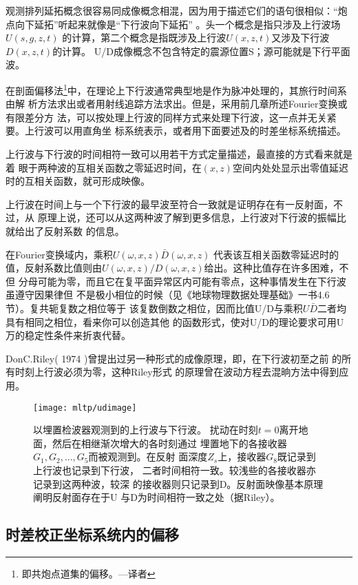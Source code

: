 观测排列延拓概念很容易同成像概念相混，因为用于描述它们的语句很相似：“炮
点向下延拓”听起来就像是“下行波向下延拓”
。头一个概念是指只涉及上行波场$U(s,g,z,t)$
的计算，第二个概念是指既涉及上行波$U(x,z,t)$又涉及下行波$D(x,z,t)$的计算。
U/D成像概念不包含特定的震源位置S；源可能就是下行平面波。

在剖面偏移法\footnote{
即共炮点道集的偏移。---译者
}中，在理论上下行波通常典型地是作为脉冲处理的，其旅行时间系由解
析方法求出或者用射线追踪方法求出。但是，采用前几章所述Fourier变换或有限差分方
法，可以按处理上行波的同样方式来处理下行波，这一点并无关紧要。上行波可以用直角坐
标系统表示，或者用下面要述及的时差坐标系统描述。

上行波与下行波的时间相符一致可以用若干方式定量描述，最直接的方式看来就是着
眼于两种波的互相关函数之零延迟时间，在$(x,z)$空间内处处显示出零值延迟时的互相关函数，就可形成映像。

上行波在时间上与一个下行波的最早波至符合一致就是证明存在有一反射面，不过，从
原理上说，还可以从这两种波了解到更多信息，上行波对下行波的振幅比就给出了反射系数
的信息。

在Fourier变换域内，乘积$U(\omega,x,z)\bar{D}(\omega,x,z)$
代表该互相关函数零延迟时的
值，反射系数比值则由$U(\omega,x,z)/D(\omega,x,z)$给出。这种比值存在许多困难，不但
分母可能为零，而且它在复平面异常区内可能有零点，这种事情发生在下行波虽遵守因果律但
不是极小相位的时候（见《地球物理数据处理基础》一书4.6节）。复共轭复数之相位等于
该复数倒数之相位，因而比值U/D与乘积$U\bar{D}$二者均具有相同之相位，看来你可以创造其他
的函数形式，使对U/D的理论要求可用U万的稳定性条件来折衷代替。

DonC.Riley( 1974
)曾提出过另一种形式的成像原理，即，在下行波初至之前
的所有时刻上行波必须为零，这种Riley形式
的原理曾在波动方程去混晌方法中得到应用。

\begin{figure}[H]
\centering
\texttt{[image: mltp/udimage]}
\caption[udimage]{以埋置检波器观测到的上行波与下行波。
扰动在时刻$t=0$离开地面，然后在相继渐次增大的各时刻通过
埋置地下的各接收器$G_1,G_2,...,G_5$而被观测到。在反射
面深度$Z_s$上，接收器$G_8$既记录到上行波也记录到下行波，
二者时间相符一致。较浅些的各接收器亦记录到这两种波，较深
的接收器则只记录到D。反射面映像基本原理阐明反射面存在于U
与D为时间相符一致之处（据Riley）。
}
\label{fig:mltp/udimage}
\end{figure}


\subsection{时差校正坐标系统内的偏移}
\label{sec:5.7.2}


